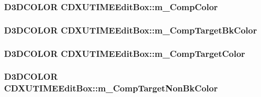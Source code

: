 \label{class_c_d_x_u_t_i_m_e_edit_box_a16acb29b8433a114b9e56319d54dd418}
\hypertarget{class_c_d_x_u_t_i_m_e_edit_box_a43d97af287e09d32fe03c9ec2a28d5ea}{
\subsubsection[{m\_\-CompColor}]{\setlength{\rightskip}{0pt plus 5cm}D3DCOLOR {\bf CDXUTIMEEditBox::m\_\-CompColor}}}
\label{class_c_d_x_u_t_i_m_e_edit_box_a43d97af287e09d32fe03c9ec2a28d5ea}
\hypertarget{class_c_d_x_u_t_i_m_e_edit_box_abab28401ad563686e82cd22324bdfc71}{
\subsubsection[{m\_\-CompTargetBkColor}]{\setlength{\rightskip}{0pt plus 5cm}D3DCOLOR {\bf CDXUTIMEEditBox::m\_\-CompTargetBkColor}}}
\label{class_c_d_x_u_t_i_m_e_edit_box_abab28401ad563686e82cd22324bdfc71}
\hypertarget{class_c_d_x_u_t_i_m_e_edit_box_ac03e89b53c4bcc8574aba818a8f53ade}{
\subsubsection[{m\_\-CompTargetColor}]{\setlength{\rightskip}{0pt plus 5cm}D3DCOLOR {\bf CDXUTIMEEditBox::m\_\-CompTargetColor}}}
\label{class_c_d_x_u_t_i_m_e_edit_box_ac03e89b53c4bcc8574aba818a8f53ade}
\hypertarget{class_c_d_x_u_t_i_m_e_edit_box_a7bf58b958e0e9dc439c4e3c5f75998b0}{
\subsubsection[{m\_\-CompTargetNonBkColor}]{\setlength{\rightskip}{0pt plus 5cm}D3DCOLOR {\bf CDXUTIMEEditBox::m\_\-CompTargetNonBkColor}}}
